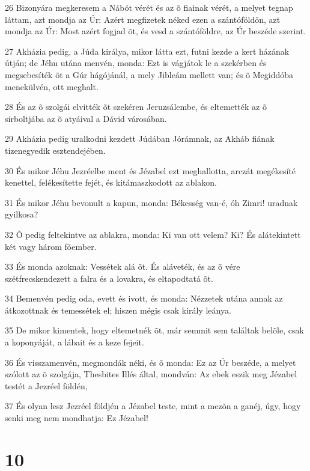 \par 26 Bizonyára megkeresem a Nábót vérét és az õ fiainak vérét, a melyet tegnap láttam, azt mondja az Úr: Azért megfizetek néked ezen a szántóföldön, azt mondja az Úr: Most azért fogjad õt, és vesd a szántóföldre, az Úr beszéde szerint.
\par 27 Akházia pedig, a Júda királya, mikor látta ezt, futni kezde a kert házának útján; de Jéhu utána menvén, monda: Ezt is vágjátok le a szekérben és megsebesíték õt a Gúr hágójánál, a mely Jibleám mellett van; és õ Megiddóba  menekülvén, ott meghalt.
\par 28 És az õ szolgái elvitték õt szekéren Jeruzsálembe, és eltemették az õ sirboltjába az õ atyáival a Dávid városában.
\par 29 Akházia pedig uralkodni kezdett Júdában Jórámnak, az Akháb fiának tizenegyedik esztendejében.
\par 30 És mikor Jéhu Jezréelbe ment és Jézabel ezt meghallotta, arczát megékesíté kenettel, felékesítette fejét, és kitámaszkodott az ablakon.
\par 31 És mikor Jéhu bevonult a kapun, monda: Békesség van-é, óh Zimri! uradnak gyilkosa?
\par 32 Õ pedig feltekintve az ablakra, monda: Ki van ott velem? Ki? És alátekintett két vagy három fõember.
\par 33 És monda azoknak: Vessétek alá õt. És aláveték, és az õ vére szétfrecskendezett a falra és a lovakra, és eltapodtatá õt.
\par 34 Bemenvén pedig oda, evett és ivott, és monda: Nézzetek utána annak az átkozottnak és temessétek el; hiszen mégis csak  király leánya.
\par 35 De mikor kimentek, hogy eltemetnék õt, már semmit sem találtak belõle, csak a koponyáját, a lábait és a keze fejeit.
\par 36 És visszamenvén, megmondák néki, és õ monda: Ez az Úr beszéde, a melyet szólott az õ szolgája, Thesbites Illés által, mondván: Az ebek eszik meg Jézabel testét a Jezréel földén,
\par 37 És olyan lesz Jezréel földjén a Jézabel teste, mint a mezõn a ganéj, úgy, hogy senki meg nem mondhatja: Ez Jézabel!

\chapter{10}

